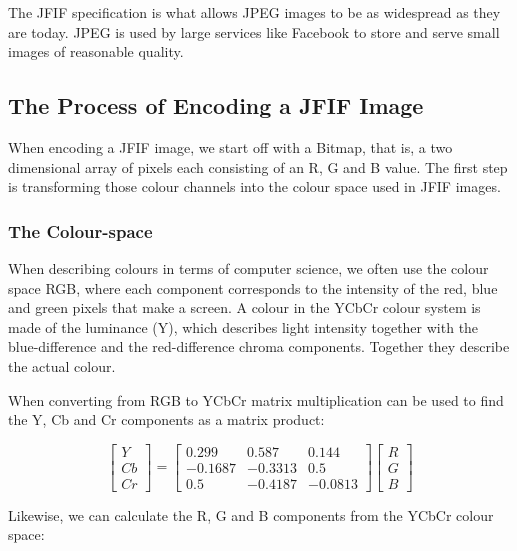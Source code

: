 \begin{infobox}
The JFIF specification is what allows JPEG images to be as widespread as they are today.
JPEG is used by large services like Facebook to store and serve small images of reasonable quality.

\vspace{4mm}
\subsection{The Process of Encoding a JFIF Image}
\vspace{-2.5mm}
When encoding a JFIF image, we start off with a Bitmap, that is, a two dimensional array of pixels each consisting of an R, G and B value. The first step is transforming those colour channels into the colour space used in JFIF images. 

\vspace{4mm}
\subsubsection{The Colour-space}
\vspace{-2.5mm}
When describing colours in terms of computer science, we often use the colour space RGB, where each component corresponds to the intensity of the red, blue and green pixels that make a screen. 
A colour in the YCbCr colour system is made of the luminance (Y), which describes light intensity together with the blue-difference and the red-difference chroma components.
Together they describe the actual colour.

When converting from RGB to YCbCr matrix multiplication can be used to find the Y, Cb and Cr components as a matrix product:

$$\begin{bmatrix}
	Y\\Cb\\Cr
\end{bmatrix} = \begin{bmatrix}
	0.299 & 0.587 & 0.144\\
	-0.1687 & -0.3313 & 0.5\\
	0.5 & -0.4187 & -0.0813
\end{bmatrix}\begin{bmatrix}
	R\\G\\B
\end{bmatrix}$$

Likewise, we can calculate the R, G and B components from the YCbCr colour space:


\end{infobox}
